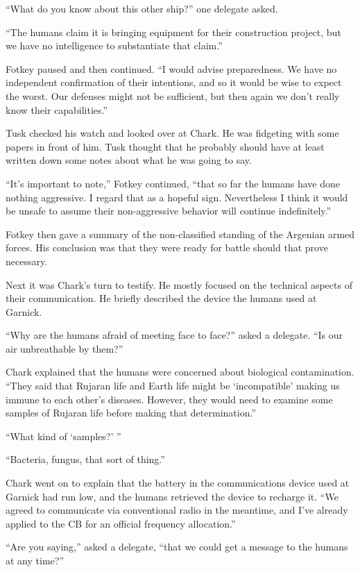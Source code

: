``What do you know about this other ship?'' one delegate asked.

``The humans claim it is bringing equipment for their construction project, but we have no
intelligence to substantiate that claim.''

Fotkey paused and then continued. ``I would advise preparedness. We have no independent
confirmation of their intentions, and so it would be wise to expect the worst. Our defenses
might not be sufficient, but then again we don't really know their capabilities.''

Tusk checked his watch and looked over at Chark. He was fidgeting with some papers in front of
him. Tusk thought that he probably should have at least written down some notes about what he
was going to say.

``It's important to note,'' Fotkey continued, ``that so far the humans have done nothing
aggressive. I regard that as a hopeful sign. Nevertheless I think it would be unsafe to assume
their non-aggressive behavior will continue indefinitely.''

Fotkey then gave a summary of the non-classified standing of the Argenian armed forces. His
conclusion was that they were ready for battle should that prove necessary.

Next it was Chark's turn to testify. He mostly focused on the technical aspects of their
communication. He briefly described the device the humans used at Garnick.

``Why are the humans afraid of meeting face to face?'' asked a delegate. ``Is our air
unbreathable by them?''

Chark explained that the humans were concerned about biological contamination. ``They said that
Rujaran life and Earth life might be `incompatible' making us immune to each other's diseases.
However, they would need to examine some samples of Rujaran life before making that
determination.''

``What kind of `samples?' ''

``Bacteria, fungus, that sort of thing.''

Chark went on to explain that the battery in the communications device used at Garnick had run
low, and the humans retrieved the device to recharge it. ``We agreed to communicate via
conventional radio in the meantime, and I've already applied to the CB for an official frequency
allocation.''

``Are you saying,'' asked a delegate, ``that we could get a message to the humans at any time?''

